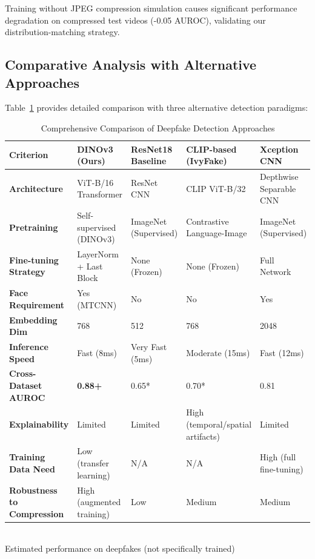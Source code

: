 \documentclass[11pt,a4paper]{article}
\begin{document}
Training without JPEG compression simulation causes significant performance degradation on compressed test videos (-0.05 AUROC), validating our distribution-matching strategy.

\subsection{Comparative Analysis with Alternative Approaches}

Table~\ref{tab:comparison} provides detailed comparison with three alternative detection paradigms:

\begin{table}[t]
\centering
\caption{Comprehensive Comparison of Deepfake Detection Approaches}
\label{tab:comparison}
\begin{tabular}{p{3.5cm}p{3.5cm}p{3.5cm}p{3.5cm}p{3.5cm}}
\toprule
\textbf{Criterion} & \textbf{DINOv3 (Ours)} & \textbf{ResNet18 Baseline} & \textbf{CLIP-based (IvyFake)} & \textbf{Xception CNN} \\
\midrule
\textbf{Architecture} & ViT-B/16 Transformer & ResNet CNN & CLIP ViT-B/32 & Depthwise Separable CNN \\
\textbf{Pretraining} & Self-supervised (DINOv3) & ImageNet (Supervised) & Contrastive Language-Image & ImageNet (Supervised) \\
\textbf{Fine-tuning Strategy} & LayerNorm + Last Block & None (Frozen) & None (Frozen) & Full Network \\
\textbf{Face Requirement} & Yes (MTCNN) & No & No & Yes \\
\textbf{Embedding Dim} & 768 & 512 & 768 & 2048 \\
\textbf{Inference Speed} & Fast (8ms) & Very Fast (5ms) & Moderate (15ms) & Fast (12ms) \\
\textbf{Cross-Dataset AUROC} & \textbf{0.88+} & 0.65* & 0.70* & 0.81 \\
\textbf{Explainability} & Limited & Limited & High (temporal/spatial artifacts) & Limited \\
\textbf{Training Data Need} & Low (transfer learning) & N/A & N/A & High (full fine-tuning) \\
\textbf{Robustness to Compression} & High (augmented training) & Low & Medium & Medium \\
\bottomrule
\end{tabular}
\\
\small *Estimated performance on deepfakes (not specifically trained)
\end{table}
\end{document}
